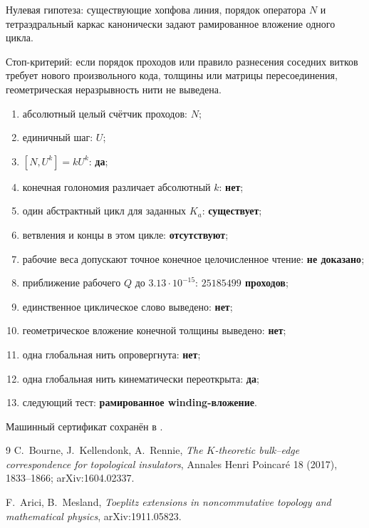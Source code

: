 Нулевая гипотеза: существующие хопфова линия, порядок оператора $N$ и
тетраэдральный каркас канонически задают рамированное вложение одного
цикла.

Стоп-критерий: если порядок проходов или правило разнесения соседних
витков требует нового произвольного кода, толщины или матрицы
пересоединения, геометрическая неразрывность нити не выведена.

\begin{protocol}
\begin{enumerate}
 \item абсолютный целый счётчик проходов: \textbf{$N$};
 \item единичный шаг: \textbf{$U$};
 \item $[N,U^k]=kU^k$: \textbf{да};
 \item конечная голономия различает абсолютный $k$: \textbf{нет};
 \item один абстрактный цикл для заданных $K_a$: \textbf{существует};
 \item ветвления и концы в этом цикле: \textbf{отсутствуют};
 \item рабочие веса допускают точное конечное целочисленное чтение:
 \textbf{не доказано};
 \item приближение рабочего $Q$ до $3.13\cdot10^{-15}$:
 \textbf{$25185499$ проходов};
 \item единственное циклическое слово выведено: \textbf{нет};
 \item геометрическое вложение конечной толщины выведено: \textbf{нет};
 \item одна глобальная нить опровергнута: \textbf{нет};
 \item одна глобальная нить кинематически переоткрыта: \textbf{да};
 \item следующий тест: \textbf{рамированное winding-вложение}.
\end{enumerate}
\end{protocol}

Машинный сертификат сохранён в
.

\begin{thebibliography}{9}
C.~Bourne, J.~Kellendonk, A.~Rennie,
\emph{The $K$-theoretic bulk--edge correspondence for topological
insulators},
Annales Henri Poincar\'e 18 (2017), 1833--1866; arXiv:1604.02337.

F.~Arici, B.~Mesland,
\emph{Toeplitz extensions in noncommutative topology and mathematical
physics},
arXiv:1911.05823.
\end{thebibliography}